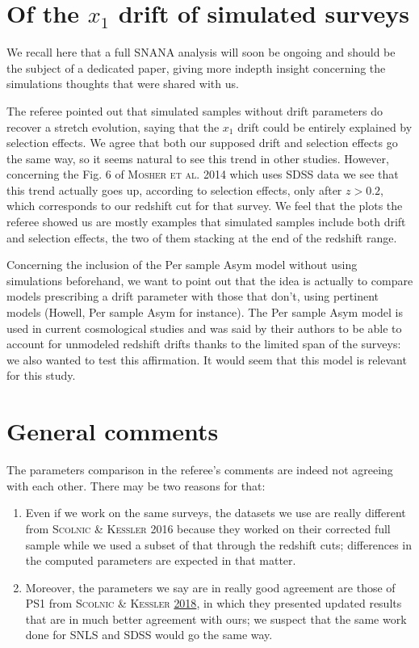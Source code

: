 \documentclass[11pt,a4paper]{paper}
\begin{document}
\section{Of the $x_1$ drift of simulated surveys}
We recall here that a full SNANA analysis will soon be ongoing and should be the
subject of a dedicated paper, giving more indepth insight concerning the
simulations thoughts that were shared with us. \bigbreak

The referee pointed out that simulated samples without drift parameters do
recover a stretch evolution, saying that the $x_1$ drift could be entirely
explained by selection effects. We agree that both our supposed drift and
selection effects go the same way, so it seems natural to see this trend in
other studies. However, concerning the Fig. 6 of \textsc{Mosher et al.} 2014
which uses SDSS data we see that this trend actually goes up, according to
selection effects, only after $z > 0.2$, which corresponds to our redshift cut
for that survey. We feel that the plots the referee showed us are mostly
examples that simulated samples include both drift and selection effects, the
two of them stacking at the end of the redshift range. \bigbreak

Concerning the inclusion of the Per sample Asym model without using simulations
beforehand, we want to point out that the idea is actually to compare models
prescribing a drift parameter with those that don't, using pertinent models
(Howell, Per sample Asym for instance). The Per sample Asym model is used in
current cosmological studies and was said by their authors to be able to account
for unmodeled redshift drifts thanks to the limited span of the surveys: we
also wanted to test this affirmation. It would seem that this model is relevant
for this study. \bigbreak

\section{General comments}
The parameters comparison in the referee's comments are indeed not agreeing with
each other. There may be two reasons for that:
\begin{enumerate}

    \item Even if we work on the same surveys, the datasets we use are really
        different from \textsc{Scolnic \& Kessler} 2016 because they worked on
        their corrected full sample while we used a subset of that through the
        redshift cuts; differences in the computed parameters are expected in
        that matter.

    \item Moreover, the parameters we say are in really good agreement are those
        of PS1 from \textsc{Scolnic \& Kessler} \underline{2018}, in which they
        presented updated results that are in much better agreement with ours;
        we suspect that the same work done for SNLS and SDSS would go the same
        way.

\end{enumerate}
\end{document}
